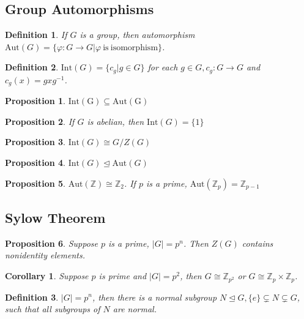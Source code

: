 \documentclass[12pt]{article}
\newtheorem{definition}{Definition}[subsection]
\newtheorem{proposition}{Proposition}[subsection]
\newtheorem{corollary}{Corollary}[subsection]
\begin{document}
		\subsection{Group Automorphisms}
			\begin{definition}
				If $G$ is a group, then automorphism $\mathrm{Aut}(G) = \{\varphi: G \rightarrow G | \varphi\ \mathrm{is\ isomorphism}\}$. 
			\end{definition}
			
			\begin{definition}
				$\mathrm{Int}(G) = \{c_g | g\in G\}$ for each $g \in G, c_g: G \rightarrow G$ and $c_g(x) = gxg^{-1}$.
			\end{definition}
			
			\begin{proposition}
				$\mathrm{Int(G)} \subseteq \mathrm{Aut(G)}$
			\end{proposition}
			
			\begin{proposition}
				If $G$ is abelian, then $\mathrm{Int}(G) = \{1\}$
			\end{proposition}
			
			\begin{proposition}
				$\mathrm{Int}(G) \cong G / Z(G)$
			\end{proposition}
			
			\begin{proposition}
				$\mathrm{Int}(G) \unlhd \mathrm{Aut}(G)$
			\end{proposition}
		
			\begin{proposition}
				$\mathrm{Aut}(\mathbb{Z}) \cong \mathbb{Z}_2$. If $p$ is a prime, $\mathrm{Aut}(\mathbb{Z}_p) = \mathbb{Z}_{p - 1}$
			\end{proposition}
		
		\subsection{Sylow Theorem}
		
			\begin{proposition}
				Suppose $p$ is a prime, $|G| = p^n$. Then $Z(G)$ contains nonidentity elements.
			\end{proposition}
		
			\begin{corollary}
				Suppose $p$ is prime and $|G| = p^2$, then $G \cong \mathbb{Z}_{p^2}$ or $G \cong \mathbb{Z}_p \times \mathbb{Z}_p$.
			\end{corollary}
			\begin{definition}
				$|G| = p^n$, then there is a normal subgroup $N \unlhd G, \{e\} \subsetneq N \subsetneq G$, such that all subgroups of $N$ are normal.
			\end{definition}
			
\end{document}
